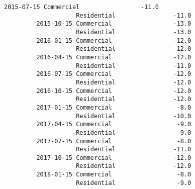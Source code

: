 \documentclass[11pt]{article}
\begin{document}
\begin{Verbatim}[commandchars=\\\{\}]
         2015-07-15 Commercial                 -11.0   
                    Residential                -11.0   
         2015-10-15 Commercial                 -13.0   
                    Residential                -13.0   
         2016-01-15 Commercial                 -12.0   
                    Residential                -12.0   
         2016-04-15 Commercial                 -12.0   
                    Residential                -11.0   
         2016-07-15 Commercial                 -12.0   
                    Residential                -12.0   
         2016-10-15 Commercial                 -12.0   
                    Residential                -12.0   
         2017-01-15 Commercial                  -8.0   
                    Residential                -10.0   
         2017-04-15 Commercial                  -9.0   
                    Residential                 -9.0   
         2017-07-15 Commercial                  -8.0   
                    Residential                -11.0   
         2017-10-15 Commercial                 -12.0   
                    Residential                -12.0   
         2018-01-15 Commercial                  -8.0   
                    Residential                 -9.0   
         

\end{Verbatim}
\end{document}
